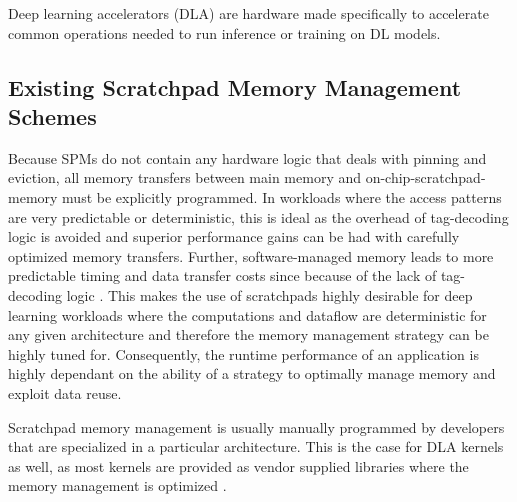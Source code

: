 Deep learning accelerators (DLA) are hardware made specifically to accelerate
common operations needed to run inference or training on DL models. 

\subsection{Existing Scratchpad Memory Management Schemes}
Because SPMs do not contain any hardware logic that deals with pinning and
eviction, all memory transfers between main memory and on-chip-scratchpad-memory
must be explicitly programmed. In workloads where the access patterns are very
predictable or deterministic, this is ideal as the overhead of tag-decoding
logic is avoided and superior performance gains can be had with carefully
optimized memory transfers. Further, software-managed memory leads to more
predictable timing and data transfer costs since because of the lack of
tag-decoding logic \cite{graphColoring}. This makes the use of scratchpads
highly desirable for deep learning workloads where the computations and
dataflow are deterministic for any given architecture and therefore the
memory management strategy can be highly tuned for. Consequently,
the runtime performance of an application is highly dependant on the
ability of a strategy to optimally manage memory and exploit data reuse.

Scratchpad memory management is usually manually programmed by developers
that are specialized in a particular architecture. This is the case for
DLA kernels as well, as most kernels are provided as vendor supplied libraries
where the memory management is optimized \cite{TVM}.

